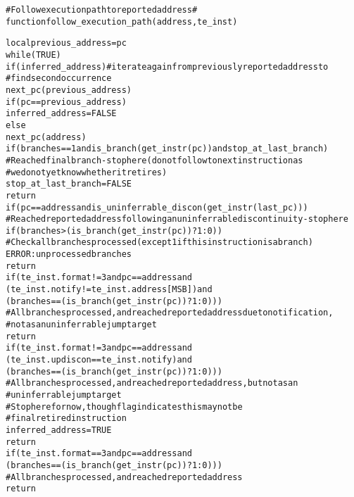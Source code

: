 \begin{alltt}
# Follow execution path to reported address #
function follow_execution_path(address, te_inst)

  local previous_address = pc
  while (TRUE)
    if (inferred_address) # iterate again from previously reported address to
                          #   find second occurrence
      next_pc(previous_address)
      if (pc == previous_address)
        inferred_address = FALSE
    else
      next_pc(address)
      if (branches == 1 and is_branch(get_instr(pc)) and stop_at_last_branch)
        # Reached final branch - stop here (do not follow to next instruction as
        #  we do not yet know whether it retires)
        stop_at_last_branch = FALSE
        return
      if (pc == address and is_uninferrable_discon(get_instr(last_pc)))
        # Reached reported address following an uninferrable discontinuity - stop here
        if (branches > (is_branch(get_instr(pc)) ? 1 : 0))
          # Check all branches processed (except 1 if this instruction is a branch)
          ERROR: unprocessed branches
        return
      if (te_inst.format != 3 and pc == address and 
        (te_inst.notify != te_inst.address[MSB]) and
        (branches == (is_branch(get_instr(pc)) ? 1 : 0)))
          # All branches processed, and reached reported address due to notification,
          # not as an uninferrable jump target
        return
      if (te_inst.format != 3 and pc == address and
        (te_inst.updiscon == te_inst.notify) and
        (branches == (is_branch(get_instr(pc)) ? 1 : 0)))
          # All branches processed, and reached reported address, but not as an
          #   uninferrable jump target
          # Stop here for now, though flag indicates this may not be
          #  final retired instruction
        inferred_address = TRUE
        return
      if (te_inst.format == 3 and pc == address and
        (branches == (is_branch(get_instr(pc)) ? 1 : 0)))
        # All branches processed, and reached reported address
        return
\end{alltt}

\pagebreak


